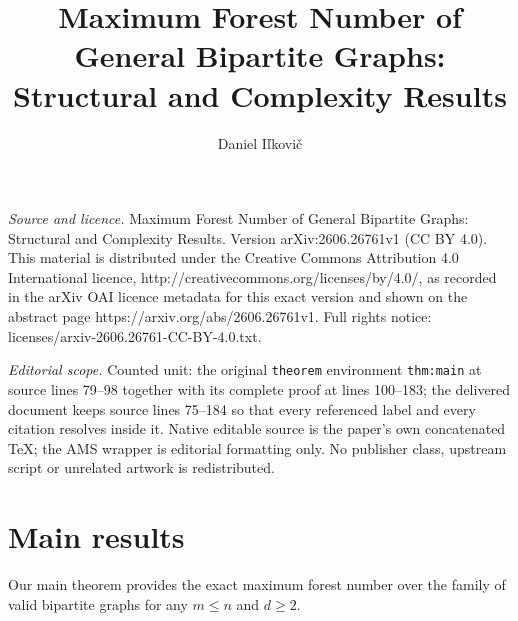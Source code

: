 \documentclass[10pt,a4paper]{amsart}
\begin{document}
\title[Maximum Forest Number of General Bipartite Graphs: Structura]{Maximum Forest Number of General Bipartite Graphs: Structural and Complexity Results}
\author{Daniel Iľkovič}
\date{}
\maketitle
\noindent\emph{Source and licence.} Maximum Forest Number of General Bipartite Graphs: Structural and Complexity Results. Version arXiv:2606.26761v1 (CC BY 4.0). This material is distributed under the Creative Commons Attribution 4.0 International licence, http://creativecommons.org/licenses/by/4.0/, as recorded in the arXiv OAI licence metadata for this exact version and shown on the abstract page https://arxiv.org/abs/2606.26761v1. Full rights notice: licenses/arxiv-2606.26761-CC-BY-4.0.txt.\par\smallskip
\noindent\textit{Editorial scope.} Counted unit: the original \texttt{theorem} environment \texttt{thm:main} at source lines 79--98 together with its complete proof at lines 100--183; the delivered document keeps source lines 75--184 so that every referenced label and every citation resolves inside it. Native editable source is the paper's own concatenated TeX; the AMS wrapper is editorial formatting only. No publisher class, upstream script or unrelated artwork is redistributed.
\section{Main results}

Our main theorem provides the exact maximum forest number over the family of valid bipartite graphs for any $m \le n$ and $d \ge 2$.
\end{document}
